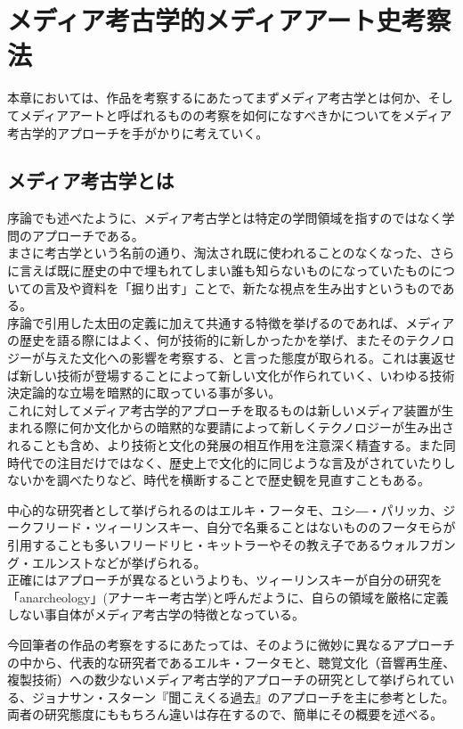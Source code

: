 \documentclass[a4paper,report]{jsbook}
\begin{document}
\chapter{メディア考古学的メディアアート史考察法}\label{ux30e1ux30c7ux30a3ux30a2ux8003ux53e4ux5b66ux7684ux30e1ux30c7ux30a3ux30a2ux30a2ux30fcux30c8ux53f2ux8003ux5bdfux6cd5}

本章においては、作品を考察するにあたってまずメディア考古学とは何か、そしてメディアアートと呼ばれるものの考察を如何になすべきかについてをメディア考古学的アプローチを手がかりに考えていく。

\section{メディア考古学とは}\label{ux30e1ux30c7ux30a3ux30a2ux8003ux53e4ux5b66ux3068ux306f}

序論でも述べたように、メディア考古学とは特定の学問領域を指すのではなく学問のアプローチである。\\
まさに考古学という名前の通り、淘汰され既に使われることのなくなった、さらに言えば既に歴史の中で埋もれてしまい誰も知らないものになっていたものについての言及や資料を「掘り出す」ことで、新たな視点を生み出すというものである。\\
序論で引用した太田の定義に加えて共通する特徴を挙げるのであれば、メディアの歴史を語る際にはよく、何が技術的に新しかったかを挙げ、またそのテクノロジーが与えた文化への影響を考察する、と言った態度が取られる。これは裏返せば新しい技術が登場することによって新しい文化が作られていく、いわゆる技術決定論的な立場を暗黙的に取っている事が多い。\\
これに対してメディア考古学的アプローチを取るものは新しいメディア装置が生まれる際に何か文化からの暗黙的な要請によって新しくテクノロジーが生み出されることも含め、より技術と文化の発展の相互作用を注意深く精査する。また同時代での注目だけではなく、歴史上で文化的に同じような言及がされていたりしないかを調べたりなど、時代を横断することで歴史観を見直すこともある。

中心的な研究者として挙げられるのはエルキ・フータモ、ユシ―・パリッカ、ジークフリード・ツィーリンスキー、自分で名乗ることはないもののフータモらが引用することも多いフリードリヒ・キットラーやその教え子であるウォルフガング・エルンストなどが挙げられる。\\
正確にはアプローチが異なるというよりも、ツィーリンスキーが自分の研究を「anarcheology」(アナーキー考古学)と呼んだように、自らの領域を厳格に定義しない事自体がメディア考古学の特徴となっている。

今回筆者の作品の考察をするにあたっては、そのように微妙に異なるアプローチの中から、代表的な研究者であるエルキ・フータモと、聴覚文化（音響再生産、複製技術）への数少ないメディア考古学的アプローチの研究として挙げられている\autocite{ohta:mediaarch}、ジョナサン・スターン『聞こえくる過去』\autocite{o_audiblepast}のアプローチを主に参考とした。\\
両者の研究態度にももちろん違いは存在するので、簡単にその概要を述べる。
\end{document}
